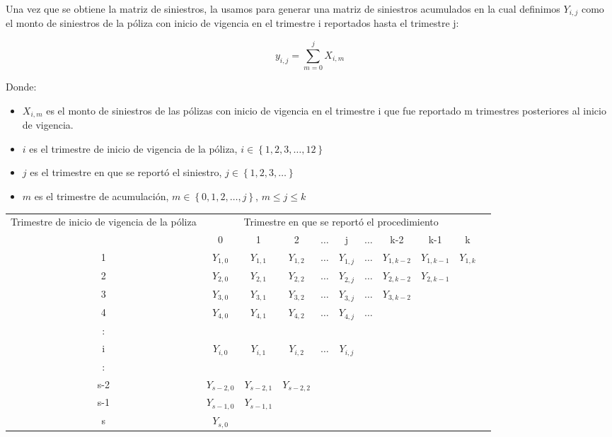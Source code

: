 \documentclass[11pt,twoside,openright,spanish]{report}
\numberwithin{equation}{chapter}
\numberwithin{figure}{chapter}
\numberwithin{table}{chapter}
\begin{document}
	\vspace{1cm}

	Una vez que se obtiene la matriz de siniestros, la usamos para generar una matriz de siniestros acumulados en la cual definimos ${Y}_{i,j}$ como el monto de siniestros de la póliza con inicio de vigencia en el trimestre i reportados hasta el trimestre j:
	
	$${y}_{i,j}=\sum _{m=0}^{j}{X}_{i,m}$$
	
	Donde:
	
	\begin{itemize}
		\item ${X}_{i,m}$ es el monto de siniestros de las pólizas con inicio de vigencia en el trimestre i que fue reportado m trimestres posteriores al inicio de vigencia.
		\item $i$ es el trimestre de inicio de vigencia de la póliza, $i\in \left\{1,2,3,\dots ,12\right\}$
		\item $j$ es el trimestre en que se reportó el siniestro,  $j\in \left\{1,2,3,\dots\right\}$
		\item $m$ es el trimestre de acumulación, $m\in \left\{0,1,2,\dots ,j\right\}$, $m\le j\le k$
	\end{itemize} 
	
	\begin{table}[ht]
	\centering
	\begin{tabularx}{\linewidth}{c|cccccccccc}
		\multirow{2}{4cm}{Trimestre de inicio de vigencia de la póliza}&\multicolumn{9}{c}{ Trimestre en que se reportó el procedimiento} \\
		& 0  & 1 & 2 & $ \dots $ & j & $\dots $ & k-2 & k-1 &  k \\
		\midrule
		1      &  $Y_{1,0}^{}$ & $Y_{1,1}^{}$ & $Y_{1,2}^{}$ & $ \dots $ & $Y_{1,j}^{}$ & $ \dots $ & $Y_{1,k-2}^{}$ & $Y_{1,k-1}^{}$ & $Y_{1,k}^{}$ \\
		2      &  $Y_{2,0}^{}$ & $Y_{2,1}^{}$ & $Y_{2,2}^{}$ & $ \dots $ & $Y_{2,j}^{}$ & $ \dots $ & $Y_{2,k-2}^{}$ & $Y_{2,k-1}^{}$ & \\
		3      &  $Y_{3,0}^{}$ & $Y_{3,1}^{}$ & $Y_{3,2}^{}$ & $ \dots $ & $Y_{3,j}^{}$ & $ \dots $ & $Y_{3,k-2}^{}$ & & \\
		4      &  $Y_{4,0}^{}$ & $Y_{4,1}^{}$ & $Y_{4,2}^{}$ & $ \dots $ & $Y_{4,j}^{}$ & $ \dots $ & & & \\
		:      & & & & & & & & &\\
		i      &  $Y_{i,0}^{}$ & $Y_{i,1}^{}$ & $Y_{i,2}^{}$ & $ \dots $ & $Y_{i,j}^{}$ & & & & \\
		:      & & & & & & & & & \\
		s-2      &  $Y_{s-2,0}^{}$ & $Y_{s-2,1}^{}$ & $Y_{s-2,2}^{}$ & & & & & & \\
		s-1      &  $Y_{s-1,0}^{}$ & $Y_{s-1,1}^{}$ & & & & & & & \\
		s      &  $Y_{s,0}^{}$ & & & & & & & & \\
	\end{tabularx}
	\end{table}
	
\end{document}
